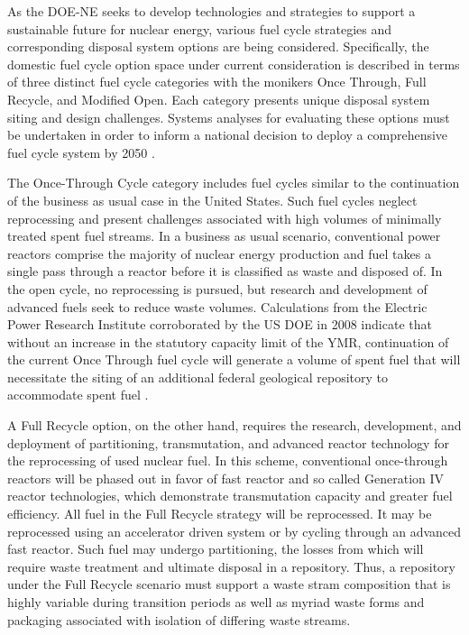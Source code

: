 As the DOE-NE seeks to develop technologies and strategies to support a 
sustainable future for nuclear energy, various fuel cycle strategies and 
corresponding disposal system options are being considered.  Specifically, the 
domestic fuel cycle option space under current consideration is described in 
terms of three distinct fuel cycle categories with the monikers Once Through, 
Full Recycle, and Modified Open. Each category presents unique disposal system 
siting and design challenges. Systems analyses for evaluating these options must 
be undertaken in order to inform a national decision to deploy a comprehensive 
fuel cycle system by 2050 \cite{doe_nuclear_2010}. 


The Once-Through Cycle category includes fuel cycles similar to the continuation 
of the business as usual case in the United States.
Such fuel cycles neglect reprocessing and present challenges associated with 
high volumes of minimally treated spent fuel streams.  In a business as usual 
scenario, conventional power reactors comprise the majority of nuclear energy 
production and fuel takes a single pass through a reactor before it is 
classified as waste and disposed of. In the open cycle, no reprocessing is 
pursued, but research and development of advanced fuels seek to reduce waste 
volumes. Calculations from the Electric Power Research Institute corroborated by 
the \gls{US} \gls{DOE} in 2008 indicate that without an increase in the statutory 
capacity limit of the \gls{YMR}, continuation of the current Once Through fuel 
cycle will generate a volume of spent fuel that will necessitate
the siting of an additional federal geological repository to accommodate spent 
fuel \cite{kessler_room_2006, doe_report_2008}. 


A Full Recycle option, on the other hand, requires the research, development, 
and deployment of partitioning, transmutation, and advanced reactor technology 
for the reprocessing of used nuclear fuel.  In this scheme, conventional 
once-through reactors will be phased out in favor of fast reactor and so called 
Generation IV reactor technologies, which demonstrate transmutation capacity and 
greater fuel efficiency. All fuel in the Full Recycle strategy will be 
reprocessed. It may be reprocessed using  an accelerator driven system or by 
cycling through an advanced fast reactor. Such fuel may undergo partitioning, 
the losses from which will require waste treatment and ultimate disposal in a 
repository. Thus, a repository under the Full Recycle scenario must support
a waste stram composition that is highly variable during transition periods as 
well as myriad waste forms and packaging associated with isolation of differing 
waste streams.

